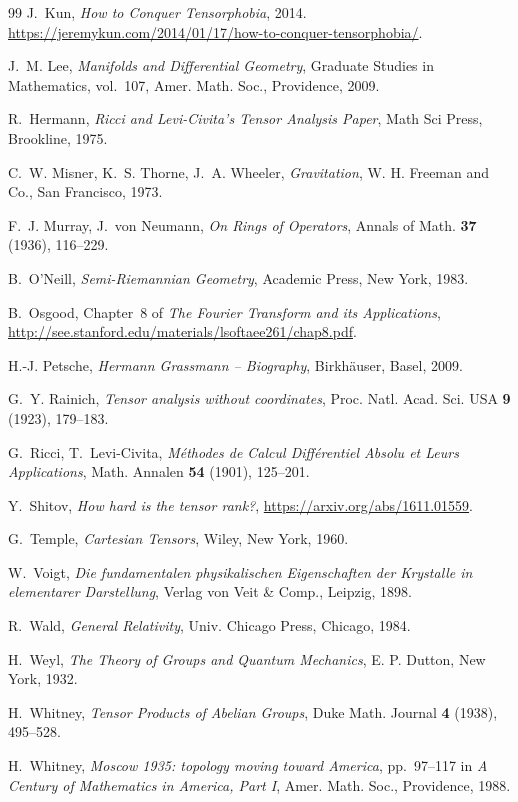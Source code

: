 \begin{thebibliography}{99}
J.~Kun, \textit{How to Conquer Tensorphobia}, 2014. 
\url{https://jeremykun.com/2014/01/17/how-to-conquer-tensorphobia/}.

J.~M. Lee, \textit{Manifolds and Differential Geometry}, Graduate Studies in Mathematics, vol.~107, Amer. Math. Soc., Providence, 2009.

R.~Hermann, \textit{Ricci and Levi-Civita's Tensor Analysis Paper}, Math Sci Press, Brookline, 1975.

C.~W. Misner, K.~S. Thorne, J.~A. Wheeler, \textit{Gravitation}, W. H. Freeman and Co., San Francisco, 1973.

F.~J. Murray, J.~von Neumann, \textit{On Rings of Operators}, Annals of Math. \textbf{37} (1936), 116--229.

B.~O'Neill, \textit{Semi-Riemannian Geometry}, Academic Press, New York, 1983.

B.~Osgood, Chapter~8 of \textit{The Fourier Transform and its Applications}, 
\url{http://see.stanford.edu/materials/lsoftaee261/chap8.pdf}.

H.-J. Petsche, \textit{Hermann Grassmann -- Biography}, Birkh\"auser, Basel, 2009.

G.~Y. Rainich, \textit{Tensor analysis without coordinates}, Proc. Natl. Acad. Sci. USA \textbf{9} (1923), 179--183.

G.~Ricci, T.~Levi-Civita, \textit{M\'ethodes de Calcul Diff\'erentiel Absolu et Leurs Applications}, Math. Annalen \textbf{54} (1901), 125--201.

Y.~Shitov, \textit{How hard is the tensor rank?}, 
\url{https://arxiv.org/abs/1611.01559}.

G.~Temple, \textit{Cartesian Tensors}, Wiley, New York, 1960.

W.~Voigt, \textit{Die fundamentalen physikalischen Eigenschaften der Krystalle in elementarer Darstellung}, Verlag von Veit \& Comp., Leipzig, 1898.

R.~Wald, \textit{General Relativity}, Univ. Chicago Press, Chicago, 1984.

H.~Weyl, \textit{The Theory of Groups and Quantum Mechanics}, E. P. Dutton, New York, 1932.

H.~Whitney, \textit{Tensor Products of Abelian Groups}, Duke Math. Journal \textbf{4} (1938), 495--528.

H.~Whitney, \textit{Moscow 1935: topology moving toward America}, pp.~97--117 in \textit{A Century of Mathematics in America, Part I}, Amer. Math. Soc., Providence, 1988.

\end{thebibliography}
